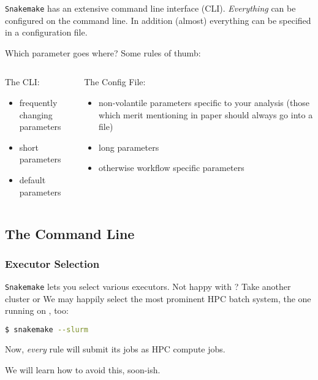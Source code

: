 \begin{frame}
  \begin{docs}
  	\texttt{Snakemake} has an extensive command line interface (CLI). \emph{Everything} can be configured on the command line. In addition (almost) everything can be specified in a configuration file.
  \end{docs}
  \pause
  \begin{exampleblock}{Which parameter goes where? Some rules of thumb:}
    \begin{columns}[t]
      \begin{column}{0.5\textwidth}
        The CLI:
        \begin{itemize}
         \item frequently changing parameters
         \item short parameters
         \item default parameters
        \end{itemize}
      \end{column}
      \begin{column}{0.5\textwidth}
        The Config File:
        \begin{itemize}
         \item non-volantile parameters specific to your analysis (those which merit mentioning in paper should always go into a file)
         \item long parameters
         \item otherwise workflow specific parameters
        \end{itemize}
      \end{column}
    \end{columns}
  \end{exampleblock}
\end{frame}


\subsection{The Command Line}

\begin{frame}[fragile]
  \frametitle{Executor Selection}
  \texttt{Snakemake} lets you select various executors. Not happy with \mogon? Take another cluster or  \newline
  We may happily select the most prominent HPC batch system, the one running on \mogon, too:
  \begin{lstlisting}[language=Bash, style=Shell]
$ snakemake --slurm
  \end{lstlisting}
  Now, \emph{every} rule will submit its jobs as HPC compute jobs.
  \begin{hint}
  	We will learn how to avoid this, soon-ish.
  \end{hint}
\end{frame}

